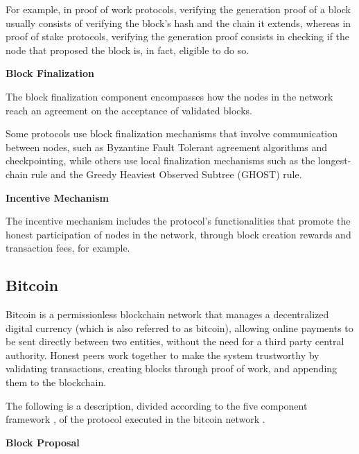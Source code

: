 For example, in proof of work protocols, verifying the generation proof of a block usually consists of verifying the block’s hash and the chain it extends, whereas in proof of stake protocols, verifying the generation proof consists in checking if the node that proposed the block is, in fact, eligible to do so.

\vspace{0.25cm}

\textbf{Block Finalization}

The block finalization component encompasses how the nodes in the network reach an agreement on the acceptance of validated blocks.

Some protocols use block finalization mechanisms that involve communication between nodes, such as Byzantine Fault Tolerant agreement algorithms and checkpointing, while others use local finalization mechanisms such as the longest-chain rule and the Greedy Heaviest Observed Subtree (GHOST) rule.

\vspace{0.25cm}

\textbf{Incentive Mechanism}

The incentive mechanism includes the protocol’s functionalities that promote the honest participation of nodes in the network, through block creation rewards and transaction fees, for example.





\subsection{Bitcoin}

Bitcoin \cite{bitcoin} is a permissionless blockchain network that manages a decentralized digital currency (which is also referred to as bitcoin), allowing online payments to be sent directly between two entities, without the need for a third party central authority. Honest peers work together to make the system trustworthy by validating transactions, creating blocks through proof of work, and appending them to the blockchain.

The following is a description, divided according to the five component framework \cite{survey_bchain_networks}, of the protocol executed in the bitcoin network \cite{bitcoin} \cite{info_propagation_bitcoin}.


\vspace{0.5cm}

\textbf{Block Proposal}

